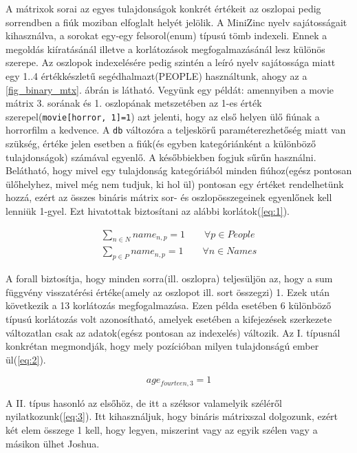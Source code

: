 \documentclass[12pt,a4paper,twoside, openright]{report}
\begin{document}
    A mátrixok sorai az egyes tulajdonságok konkrét értékeit az oszlopai pedig sorrendben a fiúk moziban elfoglalt helyét jelölik.
    A MiniZinc nyelv sajátosságait kihasználva, a sorokat egy-egy felsorol(enum) típusú tömb indexeli.
    Ennek a megoldás kiíratásánál illetve a korlátozások megfogalmazásánál lesz különös szerepe.
    Az oszlopok indexelésére pedig szintén a leíró nyelv sajátossága miatt egy {1..4} értékkészletű segédhalmazt(PEOPLE) használtunk, ahogy az a \ref{fig_binary_mtx}. ábrán is látható.
    Vegyünk egy példát: amennyiben a movie mátrix 3. sorának és 1. oszlopának metszetében az 1-es érték szerepel(\texttt{movie[horror, 1]=1}) azt jelenti, hogy az első helyen ülő fiúnak a horrorfilm a kedvence.
    A \texttt{db} változóra a teljeskörű paraméterezhetőség miatt van szükség, értéke jelen esetben a fiúk(és egyben kategóriánként a különböző tulajdonságok) számával egyenlő. A későbbiekben fogjuk sűrűn használni.
    Belátható, hogy mivel egy tulajdonság kategóriából minden fiúhoz(egész pontosan ülőhelyhez, mivel még nem tudjuk, ki hol ül) pontosan egy értéket rendelhetünk hozzá, ezért az összes bináris mátrix sor- és oszlopösszegeinek egyenlőnek kell lenniük 1-gyel.
    Ezt hivatottak biztosítani az alábbi korlátok(\ref{eq:1}).

    \begin{equation} \label{eq:1}
    \begin{aligned}
    \sum_{n\in N} name_{n,p} =1 \qquad \forall p \in People \\
    \sum_{p\in P} name_{n,p} =1 \qquad \forall n \in Names
    \end{aligned}
    \end{equation}

    A forall biztosítja, hogy minden sorra(ill. oszlopra) teljesüljön az, hogy a sum függvény visszatérési értéke(amely az oszlopot ill. sort összegzi) 1.
    Ezek után következik a 13 korlátozás megfogalmazása.
    Ezen példa esetében 6 különböző típusú korlátozás volt azonosítható, amelyek esetében a kifejezések szerkezete változatlan csak az adatok(egész pontosan az indexelés) változik.
    Az I. típusnál konkrétan megmondják, hogy mely pozícióban milyen tulajdonságú ember ül(\ref{eq:2}).

    \begin{equation} \label{eq:2}
     age_ {fourteen,3}=1 
     \end{equation}

    A II. típus hasonló az elsőhöz, de itt a széksor valamelyik széléről nyilatkozunk(\ref{eq:3}).
    Itt kihasználjuk, hogy bináris mátrixszal dolgozunk, ezért két elem összege 1 kell, hogy legyen, miszerint vagy az egyik szélen vagy a másikon ülhet Joshua.
\end{document}
